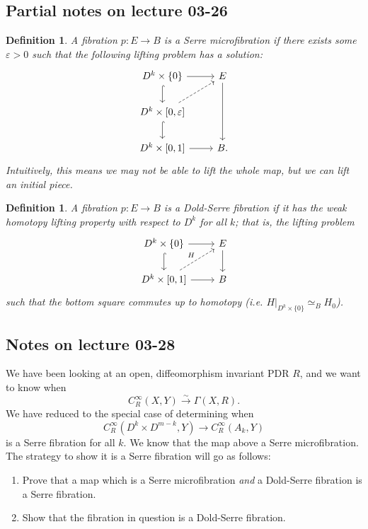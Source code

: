 \documentclass{article}
\newtheorem{definition}[theorem]{Definition}
\newtheorem{proposed work}[theorem]{Proposed Work}
\begin{document}
\subsection{Partial notes on lecture 03-26}

\begin{definition}
A fibration $p: E \to B$ is a \emph{Serre microfibration} if there exists some $\varepsilon > 0$ such that the following lifting problem has a solution:
\begin{equation*}
\begin{tikzcd}
D^k \times \{0\} \arrow[r] \arrow[d,hookrightarrow] & E \arrow[dd] \\
D^{k} \times [0,\varepsilon] \arrow[d,hookrightarrow] \arrow[ur,dashed] & \\
D^k \times [0,1] \arrow[r] & B.
\end{tikzcd}
\end{equation*}
Intuitively, this means we may not be able to lift the whole map, but we can lift an initial piece.
\end{definition}

\begin{definition}
A fibration $p:E \to B$ is a \emph{Dold-Serre} fibration if it has the weak homotopy lifting property with respect to $D^k$ for all $k$; that is, the lifting problem
\begin{equation*}
\begin{tikzcd}
D^k \times \{0\} \arrow[r] \arrow[d, hookrightarrow] & E \arrow[d] \\
D^k \times [0,1] \arrow[ur, dashed, "H"] \arrow[r] & B
\end{tikzcd}
\end{equation*}
such that the bottom square commutes up to homotopy (i.e. $H|_{D^k \times \{0\}} \simeq_B H_0$).
\end{definition}

\subsection{Notes on lecture 03-28}
We have been looking at an open, diffeomorphism invariant PDR $R$, and we want to know when
\begin{equation*}
C_R^\infty(X,Y) \overset{\sim}{\to} \Gamma(X,R).
\end{equation*}
We have reduced to the special case of determining when 
\begin{equation*}
C_R^\infty(D^k \times D^{m-k}, Y) \to C_R^\infty(A_k, Y)
\end{equation*}
is a Serre fibration for all $k$. We know that the map above a Serre microfibration. The strategy to show it is a Serre fibration will go as follows:
\begin{enumerate}
\item Prove that a map which is a Serre microfibration \emph{and} a Dold-Serre fibration is a Serre fibration. 

\item Show that the fibration in question is a Dold-Serre fibration.
\end{enumerate}
\end{document}
